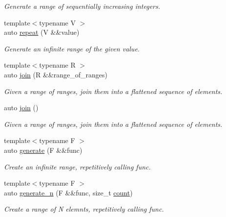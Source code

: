 \begin{DoxyCompactItemize}
\begin{DoxyCompactList}\small\item\em Generate a range of sequentially increasing integers. \end{DoxyCompactList}\item 
{\footnotesize template$<$typename V $>$ }\\auto \mbox{\hyperlink{namespacerah_1_1view_a89f73d7f0e180d9aea27a9d56ac4a1b3}{repeat}} (V \&\&value)
\begin{DoxyCompactList}\small\item\em Generate an infinite range of the given value. \end{DoxyCompactList}\item 
{\footnotesize template$<$typename R $>$ }\\auto \mbox{\hyperlink{namespacerah_1_1view_aa7c2a315fe63cbd431f2e59c75f3be08}{join}} (R \&\&range\+\_\+of\+\_\+ranges)
\begin{DoxyCompactList}\small\item\em Given a range of ranges, join them into a flattened sequence of elements. \end{DoxyCompactList}\item 
auto \mbox{\hyperlink{namespacerah_1_1view_a329ee692640cfffb055b1eb3d49d3d79}{join}} ()
\begin{DoxyCompactList}\small\item\em Given a range of ranges, join them into a flattened sequence of elements. \end{DoxyCompactList}\item 
{\footnotesize template$<$typename F $>$ }\\auto \mbox{\hyperlink{namespacerah_1_1view_a05a3de164c8d1fde6ca761119d90a789}{generate}} (F \&\&func)
\begin{DoxyCompactList}\small\item\em Create an infinite range, repetitively calling func. \end{DoxyCompactList}\item 
{\footnotesize template$<$typename F $>$ }\\auto \mbox{\hyperlink{namespacerah_1_1view_af179430e133efcf7d352b9446365e279}{generate\+\_\+n}} (F \&\&func, size\+\_\+t \mbox{\hyperlink{namespacerah_aa528865cc4a45d4eb276329554f16b4b}{count}})
\begin{DoxyCompactList}\small\item\em Create a range of N elemnts, repetitively calling func. \end{DoxyCompactList}\item 

\end{DoxyCompactItemize}
